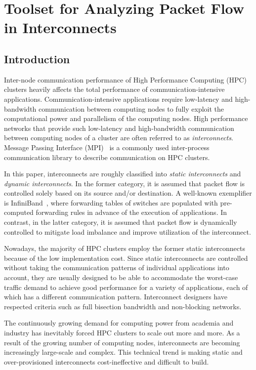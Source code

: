 \chapter{Toolset for Analyzing Packet Flow in Interconnects}\label{sec:ii}

\section{Introduction}\label{sec:ii-introduction}

Inter-node communication performance of High Performance Computing (HPC)
clusters heavily affects the total performance of
communication-intensive applications. Communication-intensive
applications require low-latency and high-bandwidth communication
between computing nodes to fully exploit the computational power and
parallelism of the computing nodes. High performance networks that
provide such low-latency and high-bandwidth communication between
computing nodes of a cluster are often referred to as
\emph{interconnects}. Message Passing Interface
(MPI)~\autocites{MessagePassingInterfaceForum2015}{Gropp2014} is a
commonly used inter-process communication library to describe
communication on HPC clusters.

In this paper, interconnects are roughly classified into \emph{static
interconnects} and \emph{dynamic interconnects}. In the former category,
it is assumed that packet flow is controlled solely based on its source
and/or destination. A well-known exemplifier is
InfiniBand~\autocite{InfiniBand2015}, where forwarding tables of
switches are populated with pre-computed forwarding rules in advance of
the execution of applications. In contrast, in the latter category, it
is assumed that packet flow is dynamically controlled to mitigate load
imbalance and improve utilization of the interconnect.

Nowadays, the majority of HPC clusters employ the former static
interconnects because of the low implementation cost. Since static
interconnects are controlled without taking the communication patterns
of individual applications into account, they are usually designed to be
able to accommodate the worst-case traffic demand to achieve good
performance for a variety of applications, each of which has a different
communication pattern. Interconnect designers have respected criteria
such as full bisection bandwidth and non-blocking networks.

The continuously growing demand for computing power from academia and
industry has inevitably forced HPC clusters to scale out more and more.
As a result of the growing number of computing nodes, interconnects are
becoming increasingly large-scale and complex. This technical trend is
making static and over-provisioned interconnects cost-ineffective and
difficult to build.

